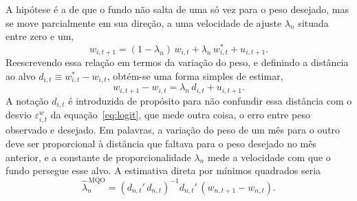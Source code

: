\documentclass[12pt,a4paper]{article}
\begin{document}
A hipótese é a de que o fundo não salta de uma só vez para o peso desejado, mas se move
parcialmente em sua direção, a uma velocidade de ajuste $\lambda_n$ situada entre zero e um,
\begin{equation}
w_{i,t+1} = (1-\lambda_n)\,w_{i,t} + \lambda_n\,w^{*}_{i,t} + u_{i,t+1}.
\label{eq:pa1}
\end{equation}
Reescrevendo essa relação em termos da variação do peso, e definindo a distância ao alvo
$d_{i,t}\equiv w^{*}_{i,t}-w_{i,t}$, obtém-se uma forma simples de estimar,
\begin{equation}
w_{i,t+1}-w_{i,t} = \lambda_n\,d_{i,t} + u_{i,t+1}.
\label{eq:pa2}
\end{equation}
A notação $d_{i,t}$ é introduzida de propósito para não confundir essa distância com o desvio
$\varepsilon^{w}_{i,t}$ da equação~\eqref{eq:logit}, que mede outra coisa, o erro entre peso
observado e desejado. Em palavras, a variação do peso de um mês para o outro deve ser
proporcional à distância que faltava para o peso desejado no mês anterior, e a constante de
proporcionalidade $\lambda_n$ mede a velocidade com que o fundo persegue esse alvo. A estimativa
direta por mínimos quadrados seria
\begin{equation}
\widehat{\lambda}^{\,\text{MQO}}_n = \left(d_{n,t}'\,d_{n,t}\right)^{-1}d_{n,t}'\,(w_{n,t+1}-w_{n,t}).
\label{eq:lambdaols}
\end{equation}
\end{document}
